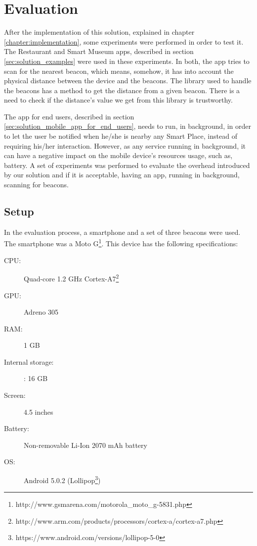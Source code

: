 
\chapter{Evaluation}
\label{chapter:evaluation}

After the implementation of this solution, explained in chapter \ref{chapter:implementation}, some experiments were performed in order to test it.
The Restaurant and Smart Museum apps, described in section \ref{sec:solution_examples} were used in these experiments. In both, the app tries to scan for the nearest beacon, which means, somehow, it has into account the physical distance between the device and the beacons.
The library used to handle the beacons has a method to get the distance from a given beacon.
There is a need to check if the distance's value we get from this library is trustworthy.

The app for end users, described in section \ref{sec:solution_mobile_app_for_end_users}, needs to run, in background, in order to let the user be notified when he/she is nearby any Smart Place, instead of requiring his/her interaction.
However, as any service running in background, it can have a negative impact on the mobile device's resources usage, such as, battery.
A set of experiments was performed to evaluate the overhead introduced by our solution and if it is acceptable, having an app, running in background, scanning for beacons.

\section{Setup}
\label{sec:evalatuon_setup}
In the evaluation process, a smartphone and a set of three beacons were used.
The smartphone was a 
Moto G\footnote{http://www.gsmarena.com/motorola\_moto\_g-5831.php}.
This device has the following specifications:
\begin{description}
  \item[\gls{CPU}:] Quad-core 1.2 GHz Cortex-A7\footnote{http://www.arm.com/products/processors/cortex-a/cortex-a7.php}
  \item[\gls{GPU}:] Adreno 305
  \item[\gls{RAM}:] 1 \gls{GB}
  \item[Internal storage:]: 16 \gls{GB}
  \item[Screen:] 4.5 inches
  \item[Battery:] Non-removable Li-Ion 2070 \gls{mAh} battery
  \item[\gls{OS}:] Android 5.0.2 (Lollipop\footnote{https://www.android.com/versions/lollipop-5-0})
\end{description}

